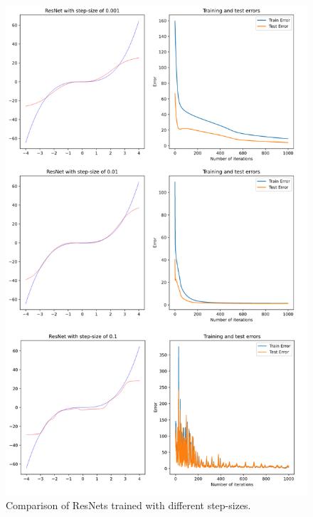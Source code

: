 \documentclass[10pt,a4paper]{article}
\theoremstyle{definition}
\theoremstyle{plain}
\begin{document}
\begin{figure}[]
\center
\includegraphics[scale=0.4]{resnet_ss.png}
\caption{Comparison of ResNets trained with different step-sizes.}
\label{res_ss}
\end{figure}
\end{document}
